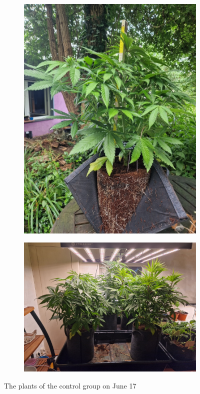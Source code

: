 \begin{figure}[H]
\begin{subfigure}[t]{.19\textwidth}
        \includegraphics[width=\linewidth]{plant_12_2024-06-17}
        \label{fig:plant_12_2024-06-17}
    \end{subfigure}
    \begin{subfigure}[t]{.3\textwidth}
        \includegraphics[width=\linewidth]{plant_ctrl_2024-06-17}
        \label{fig:plant_ctrl_2024-06-17}
    \end{subfigure}
    \caption[Plants of the control group on June 17]{The plants of the control group on June 17}
    \label{fig:plants_ctrl_2024-06-17}
\end{figure}


